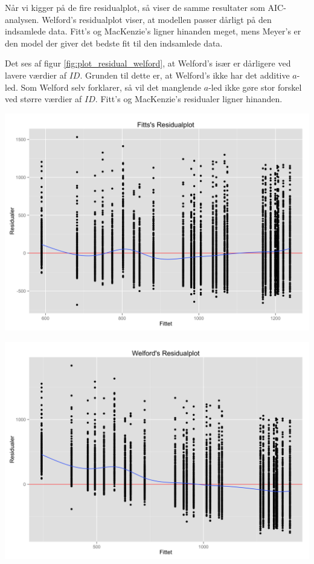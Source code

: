 Når vi kigger på de fire residualplot, så viser de samme resultater som AIC-analysen. Welford's residualplot viser, at modellen passer dårligt på den indsamlede data. Fitt's og MacKenzie's ligner hinanden meget, mens Meyer's er den model der giver det bedste fit til den indsamlede data.

Det ses af figur \ref{fig:plot_residual_welford}, at Welford's især er dårligere ved lavere værdier af $ID$. Grunden til dette er, at Welford's ikke har det additive $a$-led. Som Welford \cite{welford1968} selv forklarer, så vil det manglende $a$-led ikke gøre stor forskel ved større værdier af $ID$. Fitt's og MacKenzie's residualer ligner hinanden.

\begin{minipage}{\linewidth}
	\begin{minipage}{.5\linewidth}
		\includegraphics[width=\linewidth]{images/plots/plot_residual_fitt}
		\label{fig:plot_residual_fitt}
	\end{minipage}
	\begin{minipage}{.5\linewidth}
		\includegraphics[width=\linewidth]{images/plots/plot_residual_welford}

\end{minipage}
\end{minipage}
